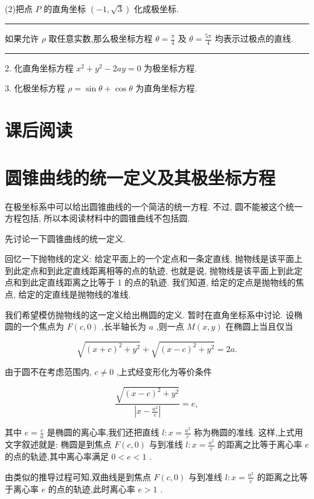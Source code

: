 \documentclass[10pt]{article}
\newcommand{\HRule}{\begin{center}\rule{0.9\linewidth}{0.2mm}\end{center}}
\begin{document}
(2)把点 \(P\) 的直角坐标 \(\left( {-1,\sqrt{3}}\right)\) 化成极坐标.

\HRule

如果允许 \(\rho\) 取任意实数,那么极坐标方程 \(\theta  = \frac{\pi }{4}\) 及 \(\theta  = \frac{5\pi }{4}\) 均表示过极点的直线.

\HRule

2. 化直角坐标方程 \({x}^{2} + {y}^{2} - {2ay} = 0\) 为极坐标方程.

3. 化极坐标方程 \(\rho  = \sin \theta  + \cos \theta\) 为直角坐标方程.

\section*{课后阅读}

\section*{圆锥曲线的统一定义及其极坐标方程}

在极坐标系中可以给出圆锥曲线的一个简洁的统一方程. 不过, 圆不能被这个统一方程包括, 所以本阅读材料中的圆锥曲线不包括圆.

先讨论一下圆锥曲线的统一定义.

回忆一下抛物线的定义: 给定平面上的一个定点和一条定直线, 抛物线是该平面上到此定点和到此定直线距离相等的点的轨迹, 也就是说, 抛物线是该平面上到此定点和到此定直线距离之比等于 1 的点的轨迹. 我们知道, 给定的定点是抛物线的焦点, 给定的定直线是抛物线的准线.

我们希望模仿抛物线的这一定义给出椭圆的定义. 暂时在直角坐标系中讨论. 设椭圆的一个焦点为 \(F\left( {c,0}\right)\) ,长半轴长为 \(a\) ,则一点 \(M\left( {x,y}\right)\) 在椭圆上当且仅当

\[
\sqrt{{\left( x + c\right) }^{2} + {y}^{2}} + \sqrt{{\left( x - c\right) }^{2} + {y}^{2}} = {2a}.
\]

由于圆不在考虑范围内, \(c \neq  0\) ,上式经变形化为等价条件

\[
\frac{\sqrt{{\left( x - c\right) }^{2} + {y}^{2}}}{\left| x - \frac{{a}^{2}}{c}\right| } = e,
\]

其中 \(e = \frac{c}{a}\) 是椭圆的离心率,我们还把直线 \(l : x = \frac{{a}^{2}}{c}\) 称为椭圆的准线. 这样,上式用文字叙述就是: 椭圆是到焦点 \(F\left( {c,0}\right)\) 与到准线 \(l : x = \frac{{a}^{2}}{c}\) 的距离之比等于离心率 \(e\) 的点的轨迹,其中离心率满足 \(0 < e < 1\) .

由类似的推导过程可知,双曲线是到焦点 \(F\left( {c,0}\right)\) 与到准线 \(l : x = \frac{{a}^{2}}{c}\) 的距离之比等于离心率 \(e\) 的点的轨迹,此时离心率 \(e > 1\) .
\end{document}
